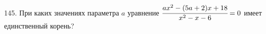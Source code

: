 145. При каких значениях параметра $a$ уравнение $\cfrac{ax^2-(5a+2)x+18}{x^2-x-6}=0$ имеет единственный корень?\\
